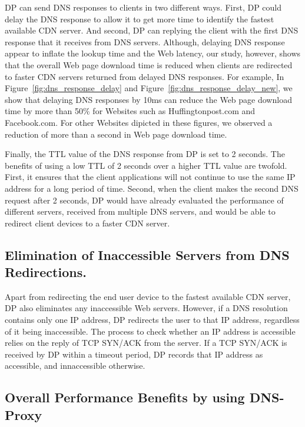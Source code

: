 \documentclass{llncs}
\begin{document}
DP can send DNS responses to clients in two different ways.
First, DP could delay the DNS response to allow it to get more time to identify the fastest available CDN server.
And second, DP can replying the client with the first DNS response that it receives from DNS servers.
Although, delaying DNS response appear to inflate the lookup time and the Web latency, our study, however, shows that the overall Web page download time is reduced when clients are redirected to faster CDN servers returned from delayed DNS responses.
For example, In Figure~\ref{fig:dns_response_delay} and Figure~\ref{fig:dns_response_delay_new}, we show that delaying DNS responses by 10ms can reduce the Web page download time by more than 50\% for Websites such as Huffingtonpost.com and Facebook.com.
For other Websites dipicted in these figures, we observed a reduction of more than a second in Web page download time.

Finally, the TTL value of the DNS response from DP is set to 2 seconds.
The benefits of using a low TTL of 2 seconds over a higher TTL value are twofold.
First, it ensures that the client applications will not continue to use the same IP address for a long period of time.
Second, when the client makes the second DNS request after 2 seconds, DP would have already evaluated the performance of different servers, received from multiple DNS servers, and would be able to redirect client devices to a faster CDN server.



\subsection{Elimination of Inaccessible Servers from DNS Redirections.}

Apart from redirecting the end user device to the fastest available CDN server, DP also eliminates any inaccessible Web servers.
However, if a DNS resolution contains only one IP address, DP redirects the user to that IP address, regardless of it being inaccessible.
The process to check whether an IP address is accessible relies on the reply of TCP SYN/ACK from the server.
If a TCP SYN/ACK is received by DP within a timeout period, DP records that IP address as accessible, and innaccessible otherwise.



\subsection{Overall Performance Benefits by using DNS-Proxy}
\end{document}
